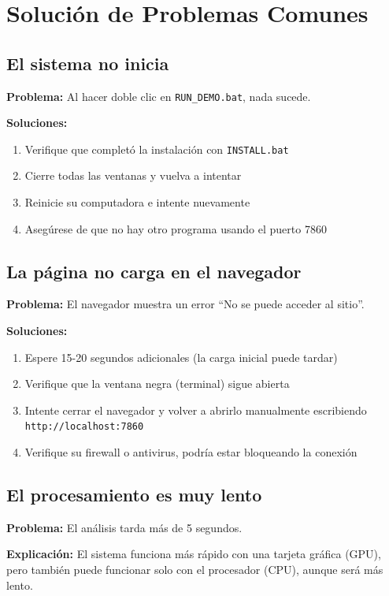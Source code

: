 \documentclass[12pt,a4paper]{article}
\begin{document}
\section{Solución de Problemas Comunes}

\subsection{El sistema no inicia}

\textbf{Problema:} Al hacer doble clic en \texttt{RUN\_DEMO.bat}, nada sucede.

\textbf{Soluciones:}
\begin{enumerate}[leftmargin=*]
    \item Verifique que completó la instalación con \texttt{INSTALL.bat}
    \item Cierre todas las ventanas y vuelva a intentar
    \item Reinicie su computadora e intente nuevamente
    \item Asegúrese de que no hay otro programa usando el puerto 7860
\end{enumerate}

\subsection{La página no carga en el navegador}

\textbf{Problema:} El navegador muestra un error ``No se puede acceder al sitio''.

\textbf{Soluciones:}
\begin{enumerate}[leftmargin=*]
    \item Espere 15-20 segundos adicionales (la carga inicial puede tardar)
    \item Verifique que la ventana negra (terminal) sigue abierta
    \item Intente cerrar el navegador y volver a abrirlo manualmente escribiendo \texttt{http://localhost:7860}
    \item Verifique su firewall o antivirus, podría estar bloqueando la conexión
\end{enumerate}

\subsection{El procesamiento es muy lento}

\textbf{Problema:} El análisis tarda más de 5 segundos.

\textbf{Explicación:} El sistema funciona más rápido con una tarjeta gráfica (GPU), pero también puede funcionar solo con el procesador (CPU), aunque será más lento.
\end{document}
